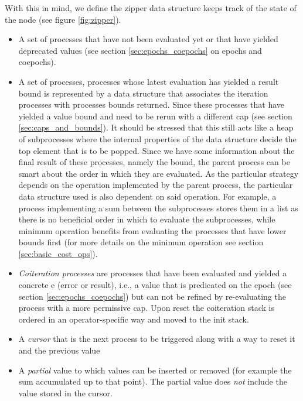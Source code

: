 With this in mind, we define the zipper data structure keeps track of
the state of the node (see figure \ref{fig:zipper}).

\begin{itemize}
\item A set of  processes that have not been evaluated
  yet or that have yielded deprecated values (see section
  \ref{sec:epochs_coepochs} on epochs and coepochs).
\item A set of  processes, processes whose latest
  evaluation has yielded a result bound is represented by a data
  structure that associates the iteration processes with
   processes bounds returned. Since these processes
  that have yielded a value bound and need to be rerun with a
  different cap (see section \ref{sec:caps_and_bounds}). It should be
  stressed that this still acts like a heap of subprocesses where the
  internal properties of the data structure decide the top element
  that is to be popped. Since we have some information about the final
  result of these processes, namely the bound, the parent process can
  be smart about the order in which they are evaluated. As the
  particular strategy depends on the operation implemented by the
  parent process, the particular data structure used is also dependent
  on said operation. For example, a process implementing a sum between
  the subprocesses stores them in a list as there is no beneficial
  order in which to evaluate the subprocesses, while minimum operation
  benefits from evaluating the processes that have lower bounds first
  (for more details on the minimum operation see section
  \ref{sec:basic_cost_ops}).

\item \emph{Coiteration processes} are processes that have been
  evaluated and yielded a concrete e (error or result), i.e., a value
  that is predicated on the epoch (see section
  \ref{sec:epochs_coepochs}) but can not be refined by re-evaluating
  the process with a more permissive cap. Upon reset the coiteration
  stack is ordered in an operator-specific way and moved to the init
  stack.
\item A \emph{cursor} that is the next process to be triggered along
  with a way to reset it and the previous value
\item A \emph{partial} value to which values can be inserted or
  removed (for example the sum accumulated up to that point). The
  partial value does \emph{not} include the value stored in the
  cursor.
\end{itemize}

